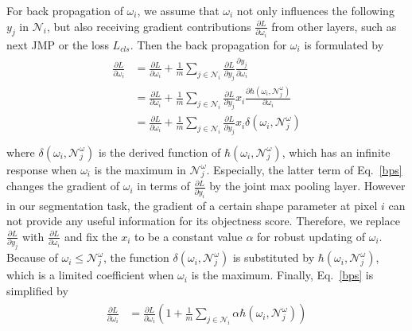 For back propagation of $\omega_i$, we assume that $\omega_{i}$ not only influences the following $y_{j}$ in $\mathcal{N}_{i}$, but also receiving gradient contributions $\frac{\partial L}{\partial \omega_{i}}$ from other layers, such as next JMP or the loss $L_{cls}$.
Then the back propagation for $\omega_{i}$ is formulated by
%
\begin{eqnarray}\label{bps}
\begin{aligned}
\frac{\partial L}{\partial \omega_{i}}&=\frac{\partial L}{\partial \omega_{i}}+\frac{1}{m}\sum_{j\in\mathcal{N}_{i}}\frac{\partial L}{\partial y_{j}}\frac{\partial y_{j}}{\partial \omega_{i}}\\
&=\frac{\partial L}{\partial \omega_{i}}+\frac{1}{m}\sum_{j\in\mathcal{N}_{i}}\frac{\partial L}{\partial y_{j}}x_{i}\frac{\partial \hbar(\omega_{i},\mathcal{N}^{\omega}_{j})}{\partial \omega_{i}}\\
&=\frac{\partial L}{\partial \omega_{i}}+\frac{1}{m}\sum_{j\in\mathcal{N}_{i}}\frac{\partial L}{\partial y_{j}}x_{i}\delta(\omega_{i},\mathcal{N}^{\omega}_{j})\\
\end{aligned}
\end{eqnarray}
where $\delta(\omega_{i},\mathcal{N}^{\omega}_{j})$ is the derived function of $\hbar(\omega_{i},\mathcal{N}^{\omega}_{j})$, which has an infinite response when $\omega_{i}$ is the maximum in $\mathcal{N}^{\omega}_{j}$.
Especially, the latter term of Eq.~\ref{bps} changes the gradient of $\omega_{i}$ in terms of $\frac{\partial L}{\partial y_{i}}$ by the joint max pooling layer.
However in our segmentation task, the gradient of a certain shape parameter at pixel $i$ can not provide any useful information for its objectness score.
Therefore, we replace $\frac{\partial L}{\partial y_{j}}$ with $\frac{\partial L}{\partial \omega_{i}}$ and fix the $x_i$ to be a constant value $\alpha$ for robust updating of $\omega_{i}$.
Because of $\omega_i\leq\mathcal{N}^{\omega}_{j}$, the function $\delta(\omega_{i},\mathcal{N}^{\omega}_{j})$ is substituted by $\hbar(\omega_{i},\mathcal{N}^{\omega}_{j})$, which is a limited coefficient when $\omega_{i}$ is the maximum.
Finally, Eq.~\ref{bps} is simplified by
\begin{eqnarray}\label{dG}
\begin{aligned}
\frac{\partial L}{\partial \omega_{i}}&=\frac{\partial L}{\partial \omega_{i}}(1+\frac{1}{m}\sum_{j\in\mathcal{N}_{i}}\alpha \hbar(\omega_{i},\mathcal{N}^{\omega}_{j}))\\
\end{aligned}
\end{eqnarray}

